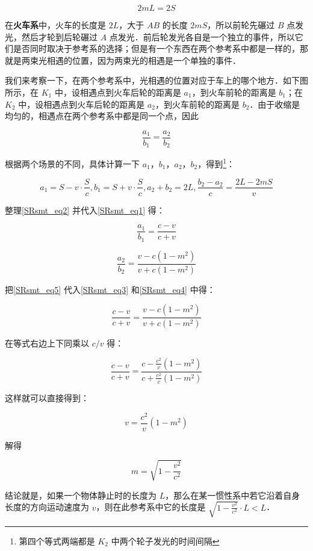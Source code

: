 \begin{equation}\label{SRsmt_eq1}
2mL=2S
\end{equation}

在\textbf{火车系}中，火车的长度是 $2L$，大于 $AB$ 的长度 $2mS$，所以前轮先碾过 $B$ 点发光，然后才轮到后轮碾过 $A$ 点发光．前后轮发光各自是一个独立的事件，所以它们是否同时取决于参考系的选择；但是有一个东西在两个参考系中都是一样的，那就是两束光相遇的位置，因为两束光的相遇是一个单独的事件．

我们来考察一下，在两个参考系中，光相遇的位置对应于车上的哪个地方．如下图所示，在 $K_1$ 中，设相遇点到火车后轮的距离是 $a_1$，到火车前轮的距离是 $b_1$；在 $K_2$ 中，设相遇点到火车后轮的距离是 $a_2$，到火车前轮的距离是 $b_2$．由于收缩是均匀的，相遇点在两个参考系中都是同一个点，因此

\begin{equation}\label{SRsmt_eq5}
\frac{a_1}{b_1}=\frac{a_2}{b_2}
\end{equation}

根据两个场景的不同，具体计算一下 $a_1$，$b_1$，$a_2$，$b_2$，得到\footnote{第四个等式两端都是 $K_2$ 中两个轮子发光的时间间隔}：

\begin{equation}\label{SRsmt_eq2}
a_1=S-v\cdot\frac{S}{c},b_1=S+v\cdot\frac{S}{c},a_2+b_2=2L,\frac{b_2-a_2}{c}=\frac{2L-2mS}{v}
\end{equation}

整理\autoref{SRsmt_eq2} 并代入\autoref{SRsmt_eq1} 得：

\begin{equation}\label{SRsmt_eq3}
\frac{a_1}{b_1}=\frac{c-v}{c+v}
\end{equation}

\begin{equation}\label{SRsmt_eq4}
\frac{a_2}{b_2}=\frac{v-c(1-m^2)}{v+c(1-m^2)}
\end{equation}

把\autoref{SRsmt_eq5} 代入\autoref{SRsmt_eq3} 和\autoref{SRsmt_eq4} 中得：

\begin{equation}
\frac{c-v}{c+v}=\frac{v-c(1-m^2)}{v+c(1-m^2)}
\end{equation}

在等式右边上下同乘以 $c/v$ 得：

\begin{equation}
\frac{c-v}{c+v}=\frac{c-\frac{c^2}{v}(1-m^2)}{c+\frac{c^2}{v}(1-m^2)}
\end{equation}

这样就可以直接得到：

\begin{equation}
v=\frac{c^2}{v}(1-m^2)
\end{equation}

解得

\begin{equation}
m=\sqrt{1-\frac{v^2}{c^2}}
\end{equation}

结论就是，如果一个物体静止时的长度为 $L$，那么在某一惯性系中若它沿着自身长度的方向运动速度为 $v$，则在此参考系中它的长度是 $\sqrt{1-\frac{v^2}{c^2}}\cdot L<L$．






